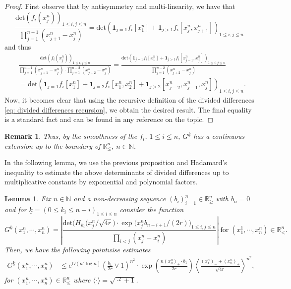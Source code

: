 \documentclass[11pt, reqno]{amsart}
\numberwithin{equation}{section}
\newcounter{dummy} \numberwithin{dummy}{section}
\newtheorem{lemma}[dummy]{Lemma}
\newtheorem*{remark}{Remark}
\newcommand{\N}{\ensuremath{\mathbb{N}}}
\newcommand{\R}{\ensuremath{\mathbb{R}}}
\begin{document}
\begin{proof}
    First observe that by antisymmetry and multi-linearity, we have that
    \begin{equation*}
        \frac{\mathrm{det}(f_i(x^n_j))_{1\le i,j \le n}}{\prod^{n-1}_{j=1}(x^n_{j+1}-x^n_j)} = \mathrm{det}(\mathbf{1}_{j=1}f_i[x^n_1] + \mathbf{1}_{j>1}f_i[x^n_j, x^n_{j+1}])_{1\le i,j \le n}
    \end{equation*}
    and thus
    \begin{equation*}
    \begin{array}{cc}
         & \displaystyle\frac{\mathrm{det}(f_i(x^n_j))_{1\le i,j \le n}}{\prod^{n-1}_{j=1}(x^n_{j+1}-x^n_j)\cdot \prod^{n-2}_{j=1}(x^n_{j+2}-x^n_j)} = \frac{\mathrm{det}(\mathbf{1}_{j=1}f_i[x^n_1] + \mathbf{1}_{j>1}f_i[x^n_{j-1}, x^n_{j}])_{1\le i,j \le n}}{\prod^{n-2}_{j=1}(x^n_{j+2}-x^n_j)}\\[3ex]
        & = \mathrm{det}(\mathbf{1}_{j=1}f_i[x^n_1] + \mathbf{1}_{j=2}f_i[x^n_1,x^n_2] + \mathbf{1}_{j>2}[x^n_{j-2}, x^n_{j-1}, x^n_{j}])_{1\le i,j \le n}.
    \end{array}
    \end{equation*}
    Now, it becomes clear that using the recursive definition of the divided differences \eqref{eq: divided differences recursion}, we obtain the desired result. The final equality is a standard fact and can be found in any reference on the topic.
\end{proof}
\begin{remark}
    Thus, by the smoothness of the $f_i$, $1\le i \le n$, $G^{\underline{k}}$ has a continuous extension up to the boundary of $\R^n_{\le}$, $n\in \N$.
\end{remark}

In the following lemma, we use the previous proposition and Hadamard's inequality to estimate the above determinants of divided differences up to multiplicative constants by exponential and polynomial factors.

\begin{lemma}\label{lemma: estimates G}
    Fix $n\in \N$ and a non-decreasing sequence $(b_i)^n_{i=1}\in \R^n_{\ge}$ with $b_n=0$ and for $\underline{k} = (0\le k_i\le n-i)_{1\le i \le n}$ consider the function
\begin{equation*}
   G^{\underline{k}}(x^n_1,\cdots, x^n_n) = \left\vert\frac{\mathrm{det}\big(H_{k_i}\big(x^n_j/\sqrt{4r}\big)\cdot \exp\big(x^n_j b_{n-i+1}/(2r)\big)_{1\le i, j\le n}}{ \displaystyle\prod_{i<j} (x^n_j-x^n_i) }\right\vert \; \mathrm{for}\; (x^1_1, \cdots, x^n_n)\in \R^n_{<}.
\end{equation*}
Then, we have the following pointwise estimates
\begin{align*}
G^{\underline{k}}(x^n_1,\cdots, x^n_n) &\le \mathrm{e}^{O(n^2\log n)}\left(\frac{b_1}{2r}\lor 1\right)^{n^2}\cdot\exp\left(\frac{n(x^n_n)_+ \cdot b_1}{2r}\right)\left\langle \frac{(x^n_1)_- + (x^n_n)_+}{\sqrt{4r}}\right\rangle^{n^2}, \; 
\end{align*}
for $(x^n_1, \cdots, x^n_n)\in \R^n_{\le}$ where $\langle \cdot \rangle = \sqrt{\cdot ^2 + 1}$.
\end{lemma}
\end{document}
